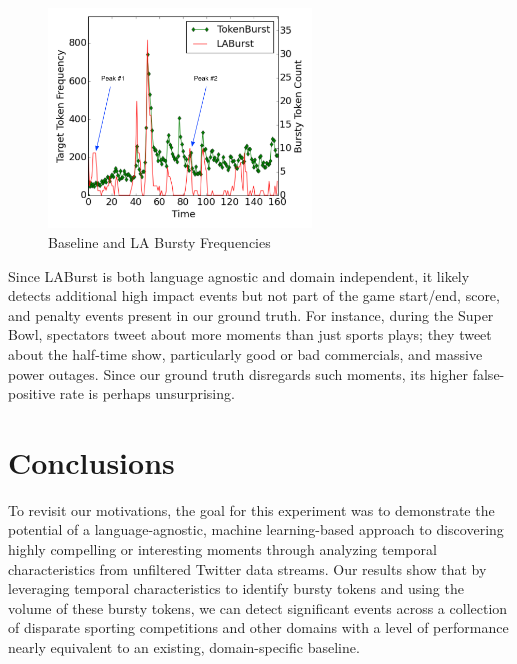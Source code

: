 \documentclass[letterpaper]{article}
\begin{document}
\begin{figure}[hbtp]
\begin{center}
\includegraphics[width=2.75in]{./figures/wc0713freq-labeled.png}
\caption{Baseline and LA Bursty Frequencies}
\label{fig:worldCupFreqs}
\end{center}
\end{figure}

Since LABurst is both language agnostic and domain independent, it likely detects additional high impact events but not part of the game start/end, score, and penalty events present in our ground truth.
For instance, during the Super Bowl, spectators tweet about more moments than just sports plays; they tweet about the half-time show, particularly good or bad commercials, and massive power outages.
Since our ground truth disregards such moments, its higher false-positive rate is perhaps unsurprising.

\section{Conclusions}
\label{sect:conlusions}

To revisit our motivations, the goal for this experiment was to demonstrate the potential of a language-agnostic, machine learning-based approach to discovering highly compelling or interesting moments through analyzing temporal characteristics from unfiltered Twitter data streams.
Our results show that by leveraging temporal characteristics to identify bursty tokens and using the volume of these bursty tokens, we can detect significant events across a collection of disparate sporting competitions and other domains with a level of performance nearly equivalent to an existing, domain-specific baseline.
\end{document}
